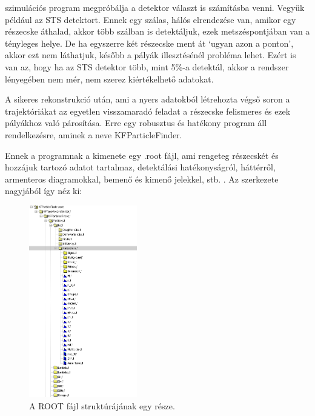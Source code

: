 \documentclass[a4paper,12pt]{article}
\begin{document}
szimulációs program megpróbálja a detektor választ is számításba venni. Vegyük például az STS detektort. Ennek egy szálas, hálós elrendezése 
van, amikor egy részecske áthalad, akkor több szálban is detektáljuk, ezek metszéspontjában van a tényleges helye. De ha egyszerre két
részecske ment át `ugyan azon a ponton', akkor ezt nem láthatjuk, később a pályák illesztésénél probléma lehet. Ezért is van az, hogy ha
az STS detektor több, mint 5$\%$-a detektál, akkor a rendszer lényegében nem mér, nem szerez kiértékelhető adatokat.
\vspace{5mm}
\par A sikeres rekonstrukció után, ami a nyers adatokból létrehozta végső soron a trajektóriákat az egyetlen visszamaradó feladat a 
részecske felismeres és ezek pályákhoz való párosítása. Erre egy robusztus és hatékony program áll rendelkezésre, aminek a neve KFParticleFinder.
\vspace{5mm}
\par Ennek a programnak a kimenete egy .root fájl, ami rengeteg részecskét és hozzájuk tartozó adatot tartalmaz, detektálási hatékonyságról,
háttérről, armenteros diagramokkal, bemenő és kimenő jelekkel, stb. . Az szerkezete nagyjából így néz ki:
\begin{figure}[H]
	\centering
	\includegraphics[width=0.42\textwidth]{particle_file.png}
	\caption{ A ROOT fájl struktúrájának egy része. }
\end{figure}
\vspace{5mm} 
\par 
\end{document}
